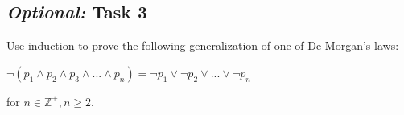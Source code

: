 \documentclass[12pt,letterpaper]{article}
\newcommand\Z{\mathbb Z}
\newif\ifsol
\newcommand{\solu}[2]{ \begin{mdframed} \ifsol #2 \else \vspace{#1} \fi \end{mdframed} }
\begin{document}
\solu{10 cm}{\textbf{Proof}

Let us define $P(n)$ as the predicate that Green will win if the game starts with $4n+1$ tasks, for $n \geq 0$.
    
\textbf{Base case.} For $n=0$, the number of tasks is $1$ which forces Blue to perform the last task and lose.
    
\textbf{Inductive Hypothesis:} Assume $P(k)$, that Green can win if the number of tasks is $4k+1$ when $k \geq 0$.
    
\textbf{Inductive Step:} We want to prove $P(k)$ IMPLIES $P(k+1)$. The number of tasks is now $4(k+1) + 1 = 4k + 5$. Blue can choose to complete either 1, 2, or 3 tasks, making the pile $4k+4$, $4k+3$, and $4k+2$, respectively. Green can then finish 3, 2, or 1 tasks, respectively, which will make the list of size $4k + 1$. Given our inductive hypothesis, Green will win, and now has a winning strategy.
    
\textbf{Conclusion:} By induction, having proven $P(0)$ and $P(k)$ IMPLIES $P(k+1)$, if the number of tasks equals $4k+1$ for some $k$, then the second player has a winning strategy.}

	\subsection*{\textit{Optional:} Task 3}

      Use induction to prove the following
      generalization of one of De Morgan's laws:
      \begin{center}
      $\lnot(p_1 \land p_2 \land p_3 \land ... \land p_n) 
      = \lnot p_1 \lor \lnot p_2 \lor ... \lor \lnot p_n$
      \end{center}
      for $n \in \Z^+, n \geq 2$.
\end{document}

